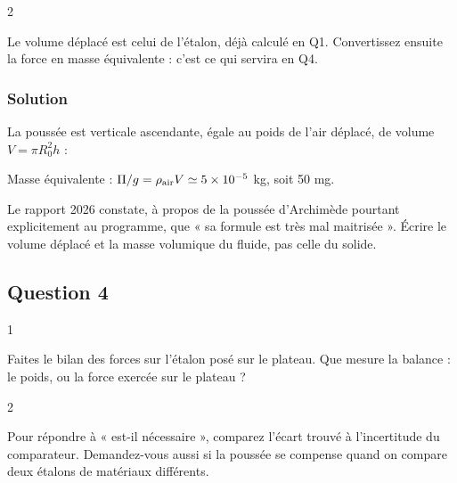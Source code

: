\documentclass[11pt,a4paper]{article}
\newcommand{\equationajustee}[1]{%
  \sbox{\boiteequation}{$\displaystyle #1$}%
  \ifdim\wd\boiteequation>\linewidth
    \[\resizebox{\linewidth}{!}{\usebox{\boiteequation}}\]%
  \else
    \[#1\]%
  \fi}
\begin{document}
\begin{indication}{2}

Le volume déplacé est celui de l'étalon, déjà calculé en Q1. Convertissez ensuite la force en masse équivalente : c'est ce qui servira en Q4.

\end{indication}

\hypertarget{solution-2}{%
\subsubsection{Solution}\label{solution-2}}

La poussée est verticale ascendante, égale au poids de l'air déplacé, de volume \(V=\pi R_0^2h\) :

\equationajustee{\boxed{\Pi=\rho_{\rm air}\,\pi R_0^2h\,g}}

\equationajustee{\boxed{\Pi\simeq1\times5\times10^{-5}\times9{,}8\simeq5\times10^{-4}\ \mathrm{N}}}

Masse équivalente : \(\Pi/g=\rho_{\rm air}V\simeq5\times10^{-5}\) kg, soit 50 mg.

\begin{jury}

Le rapport 2026 constate, à propos de la poussée d'Archimède pourtant explicitement au programme, que « sa formule est très mal maitrisée ». Écrire le volume déplacé et la masse volumique du fluide, pas celle du solide.

\end{jury}

\hypertarget{question-4}{%
\subsection{Question 4}\label{question-4}}

\begin{indication}{1}

Faites le bilan des forces sur l'étalon posé sur le plateau. Que mesure la balance : le poids, ou la force exercée sur le plateau ?

\end{indication}

\begin{indication}{2}

Pour répondre à « est-il nécessaire », comparez l'écart trouvé à l'incertitude du comparateur. Demandez-vous aussi si la poussée se compense quand on compare deux étalons de matériaux différents.

\end{indication}
\end{document}
